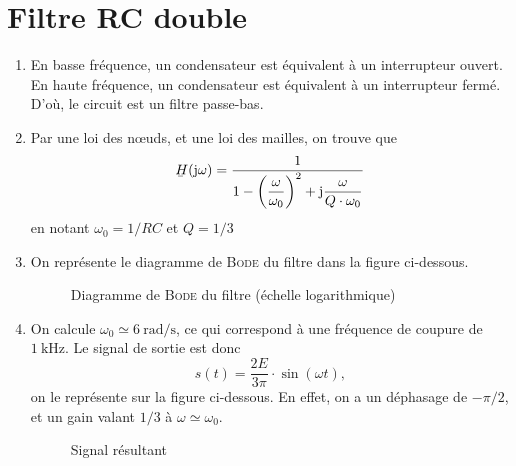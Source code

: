 \section{Filtre RC double}

\begin{enumerate}
	\item En basse fréquence, un condensateur est équivalent à un interrupteur ouvert. En haute fréquence, un condensateur est équivalent à un interrupteur fermé. D'où, le circuit est un filtre passe-bas.
	\item Par une loi des nœuds, et une loi des mailles, on trouve que
		\[
			\ubar{H}(\mathrm{j}\omega) = \dfrac{1}{1 - \left( \dfrac{\omega}{\omega_0} \right)^2 + \mathrm{j} \dfrac{\omega}{Q\cdot \omega_0}}
		\] en notant $\omega_0 = 1 / {RC}$ et $Q = 1 / 3$
	\item On représente le diagramme de \textsc{Bode} du filtre dans la figure ci-dessous.
		\begin{figure}[H]
			\centering
			
			\caption{Diagramme de \textsc{Bode} du filtre (échelle logarithmique)}
		\end{figure}
	\item On calcule $\omega_0 \simeq 6\:\mathrm{rad/s}$, ce qui correspond à une fréquence de coupure de $1\:\mathrm{kHz}$. Le signal de sortie est donc \[
			s(t) = \frac{2E}{3\pi}\cdot \sin(\omega t)
		,\] on le représente sur la figure ci-dessous. En effet, on a un déphasage de $-\pi / 2$, et un gain valant $1 / 3$ à $\omega \simeq \omega_0$.
		\begin{figure}[H]
			\centering
			
			\caption{Signal résultant}
		\end{figure}
\end{enumerate}
